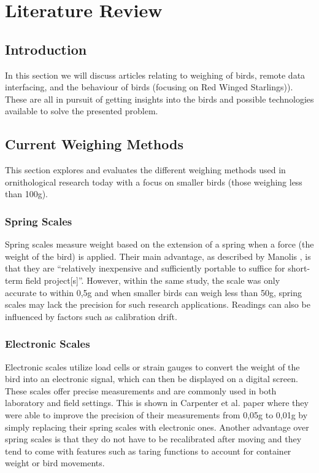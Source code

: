 \documentclass[class=report,11pt,crop=false]{standalone}
\begin{document}
\ifstandalone
\tableofcontents
\fi
\chapter{Literature Review \label{ch:literature}}
\vspace{0.5cm}

\section{Introduction}
In this section we will discuss articles relating to weighing of birds, remote data interfacing, and the behaviour of birds (focusing on Red Winged Starlings)). These are all in pursuit of getting insights into the birds and possible technologies available to solve the presented problem.


\section{Current Weighing Methods}
This section explores and evaluates the different weighing methods used in ornithological research today with a focus on smaller birds (those weighing less than 100g).

\subsection{Spring Scales}
Spring scales measure weight based on the extension of a spring when a force (the weight of the bird) is applied. Their main advantage, as described by Manolis \cite{manoils2024simple}, is that they are “relatively inexpensive and sufficiently portable to suffice for short-term field project[s]”. However, within the same study, the scale was only accurate to within 0,5g and when smaller birds can weigh less than 50g, spring scales may lack the precision for such research applications. Readings can also be influenced by factors such as calibration drift.

\subsection{Electronic Scales}
Electronic scales utilize load cells or strain gauges to convert the weight of the bird into an electronic signal, which can then be displayed on a digital screen. These scales offer precise measurements and are commonly used in both laboratory and field settings. This is shown in Carpenter et al. \cite{carpenter1983weight} paper where they were able to improve the precision of their measurements from 0,05g to 0,01g by simply replacing their spring scales with electronic ones. Another advantage over spring scales is that they do not have to be recalibrated after moving \cite{carpenter1983weight} and they tend to come with features such as taring functions to account for container weight or bird movements.
\end{document}

